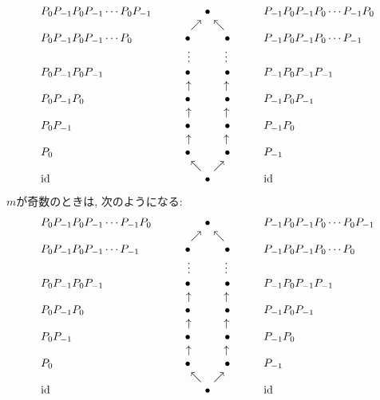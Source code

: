 \begin{align*}
  \begin{array}{clccccclc}
    &P_0P_{-1}P_0P_{-1}\cdots P_{0}P_{-1}&&&\bullet&&&P_{-1}P_0P_{-1}P_{0}\cdots P_{-1}P_0\\
    &&&&\nearrow\phantom{\bullet}\nwarrow&\\
    &P_0P_{-1}P_0P_{-1}\cdots P_{0}&&&\bullet\phantom{\nearrow\bullet\nwarrow}\bullet&&&P_{-1}P_0P_{-1}P_{0}\cdots P_{-1}\\
    &&&&\vdots\phantom{\nearrow\bullet\nwarrow}\vdots\\
    &P_0P_{-1}P_0P_{-1}&&&\bullet\phantom{\nearrow\bullet\nwarrow}\bullet&&&P_{-1}P_0P_{-1}P_{-1}\\
    &&&&\uparrow\phantom{\nearrow\,\,\nwarrow}\uparrow&\\
    &P_0P_{-1}P_0&&&\bullet\phantom{\nearrow\bullet\nwarrow}\bullet&&&P_{-1}P_0P_{-1}\\
    &&&&\uparrow\phantom{\nearrow\,\,\nwarrow}\uparrow&\\
    &P_0P_{-1}&&&\bullet\phantom{\nearrow\bullet\nwarrow}\bullet&&&P_{-1}P_0\\
    &&&&\uparrow\phantom{\nearrow\,\,\nwarrow}\uparrow&\\
    &P_0&&&\bullet\phantom{\nearrow\bullet\nwarrow}\bullet&&&P_{-1}&\\
    &&&&\nwarrow\phantom{\bullet}\nearrow&\\
    &\operatorname{id} &&&\bullet &&&\operatorname{id}
  \end{array}
\end{align*}
$m$が奇数のときは, 次のようになる:
\begin{align*}
    \begin{array}{clccccclc}
    &P_0P_{-1}P_0P_{-1}\cdots P_{-1}P_{0}&&&\bullet&&&P_{-1}P_0P_{-1}P_{0}\cdots P_{0}P_{-1}\\
    &&&&\nearrow\phantom{\bullet}\nwarrow&\\
    &P_0P_{-1}P_0P_{-1}\cdots P_{-1}&&&\bullet\phantom{\nearrow\bullet\nwarrow}\bullet&&&P_{-1}P_0P_{-1}P_{0}\cdots P_{0}\\
    &&&&\vdots\phantom{\nearrow\bullet\swarrow}\vdots\\
    &P_0P_{-1}P_0P_{-1}&&&\bullet\phantom{\nearrow\bullet\nwarrow}\bullet&&&P_{-1}P_0P_{-1}P_{-1}\\
    &&&&\uparrow\phantom{\nearrow\,\,\nwarrow}\uparrow&\\
    &P_0P_{-1}P_0&&&\bullet\phantom{\nearrow\bullet\nwarrow}\bullet&&&P_{-1}P_0P_{-1}\\
    &&&&\uparrow\phantom{\nearrow\,\,\nwarrow}\uparrow&\\
    &P_0P_{-1}&&&\bullet\phantom{\nearrow\bullet\nwarrow}\bullet&&&P_{-1}P_0\\
    &&&&\uparrow\phantom{\nearrow\,\,\nwarrow}\uparrow&\\
    &P_0&&&\bullet\phantom{\nearrow\bullet\nwarrow}\bullet&&&P_{-1}&\\
    &&&&\nwarrow\phantom{\bullet}\nearrow&\\
    &\operatorname{id} &&&\bullet &&&\operatorname{id}
  \end{array}
\end{align*}

